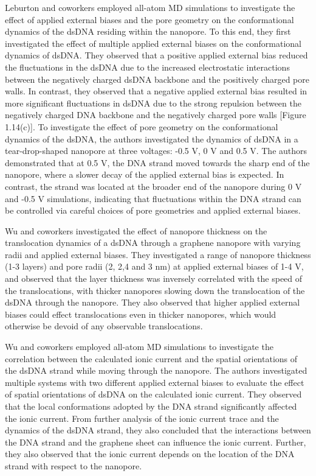 Leburton and coworkers employed all-atom MD simulations to investigate the effect of applied external biases and the pore geometry on the conformational dynamics of the dsDNA residing within the nanopore\supercite{qiu_electrically_2016}. To this end, they first investigated the effect of multiple applied external biases on the conformational dynamics of dsDNA. They observed that a positive applied external bias reduced the fluctuations in the dsDNA due to the increased electrostatic interactions between the negatively charged dsDNA backbone and the positively charged pore walls. In contrast, they observed that a negative applied external bias resulted in more significant fluctuations in dsDNA due to the strong repulsion between the negatively charged DNA backbone and the negatively charged pore walls [Figure 1.14(c)]. To investigate the effect of pore geometry on the conformational dynamics of the dsDNA, the authors investigated the dynamics of dsDNA in a tear-drop-shaped nanopore at three voltages: -0.5 V, 0 V and 0.5 V. The authors demonstrated that at 0.5 V, the DNA strand moved towards the sharp end of the nanopore, where a slower decay of the applied external bias is expected. In contrast, the strand was located at the broader end of the nanopore during 0 V and -0.5 V simulations, indicating that fluctuations within the DNA strand can be controlled via careful choices of pore geometries and applied external biases.

Wu and coworkers investigated the effect of nanopore thickness on the translocation dynamics of a dsDNA through a graphene nanopore with varying radii and applied external biases\supercite{lv_impact_2013}. They investigated a range of nanopore thickness (1-3 layers) and pore radii (2, 2,4 and 3 nm) at applied external biases of 1-4 V, and observed that the layer thickness was inversely correlated with the speed of the translocations, with thicker nanopores slowing down the translocation of the dsDNA through the nanopore. They also observed that higher applied external biases could effect translocations even in thicker nanopores, which would otherwise be devoid of any observable translocations.

Wu and coworkers employed all-atom MD simulations to investigate the correlation between the calculated ionic current and the spatial orientations of the dsDNA strand while moving through the nanopore\supercite{lv_spatial_2014}. The authors investigated multiple systems with two different applied external biases to evaluate the effect of spatial orientations of dsDNA on the calculated ionic current. They observed that the local conformations adopted by the DNA strand significantly affected the ionic current. From further analysis of the ionic current trace and the dynamics of the dsDNA strand, they also concluded that the interactions between the DNA strand and the graphene sheet can influence the ionic current. Further, they also observed that the ionic current depends on the location of the DNA strand with respect to the nanopore.

